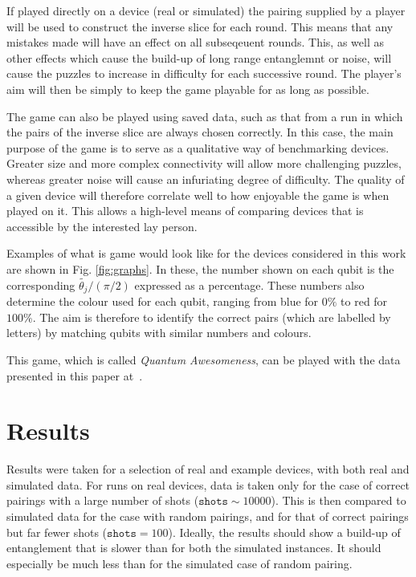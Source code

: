 \documentclass[aps,prl,twocolumn,showpacs,preprintnumbers]{revtex4-1}
\begin{document}
If played directly on a device (real or simulated) the pairing supplied by a player will be used to construct the inverse slice for each round. This means that any mistakes made will have an effect on all subseqeuent rounds. This, as well as other effects which cause the build-up of long range entanglemnt or noise, will cause the puzzles to increase in difficulty for each successive round. The player’s aim will then be simply to keep the game playable for as long as possible.

The game can also be played using saved data, such as that from a run in which the pairs of the inverse slice are always chosen correctly. In this case, the main purpose of the game is to serve as a qualitative way of benchmarking devices. Greater size and more complex connectivity will allow more challenging puzzles, whereas greater noise will cause an infuriating degree of difficulty. The quality of a given device will therefore correlate well to how enjoyable the game is when played on it. This allows a high-level means of comparing devices that is accessible by the interested lay person.

Examples of what is game would look like for the devices considered in this work are shown in Fig. \ref{fig:graphs}. In these, the number shown on each qubit is the corresponding $\tilde{\theta_j} / (\pi/2)$ expressed as a percentage. These numbers also determine the colour used for each qubit, ranging from blue for $0\%$ to red for $100\%$. The aim is therefore to identify the correct pairs (which are labelled by letters) by matching qubits with similar numbers and colours.

This game, which is called \textit{Quantum Awesomeness}, can be played with the data presented in this paper at~\cite{awesomeness}.


\section{Results}

Results were taken for a selection of real and example devices, with both real and simulated data. For runs on real devices, data is taken only for the case of correct pairings with a large number of shots ($\mathtt{shots}\sim 10000$). This is then compared to simulated data for the case with random pairings, and for that of correct pairings but far fewer shots ($\mathtt{shots} = 100$). Ideally, the results should show a build-up of entanglement that is slower than for both the simulated instances. It should especially be much less than for the simulated case of random pairing.
\end{document}
